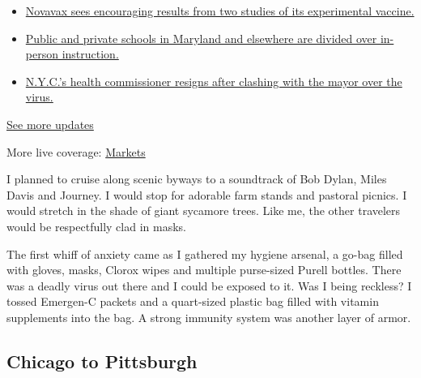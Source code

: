 \begin{itemize}
\tightlist
\item
  \href{https://www.nytimes.com/2020/08/04/world/coronavirus-cases.html?action=click\&pgtype=Article\&state=default\&region=MAIN_CONTENT_1\&context=storylines_live_updates\#link-1228a480}{Novavax
  sees encouraging results from two studies of its experimental
  vaccine.}
\item
  \href{https://www.nytimes.com/2020/08/04/world/coronavirus-cases.html?action=click\&pgtype=Article\&state=default\&region=MAIN_CONTENT_1\&context=storylines_live_updates\#link-4825b93}{Public
  and private schools in Maryland and elsewhere are divided over
  in-person instruction.}
\item
  \href{https://www.nytimes.com/2020/08/04/world/coronavirus-cases.html?action=click\&pgtype=Article\&state=default\&region=MAIN_CONTENT_1\&context=storylines_live_updates\#link-4d1eafa8}{N.Y.C.'s
  health commissioner resigns after clashing with the mayor over the
  virus.}
\end{itemize}

\href{https://www.nytimes.com/2020/08/04/world/coronavirus-cases.html?action=click\&pgtype=Article\&state=default\&region=MAIN_CONTENT_1\&context=storylines_live_updates}{See
more updates}

More live coverage:
\href{https://www.nytimes.com/live/2020/08/04/business/stock-market-today-coronavirus?action=click\&pgtype=Article\&state=default\&region=MAIN_CONTENT_1\&context=storylines_live_updates}{Markets}

I planned to cruise along scenic byways to a soundtrack of Bob Dylan,
Miles Davis and Journey. I would stop for adorable farm stands and
pastoral picnics. I would stretch in the shade of giant sycamore trees.
Like me, the other travelers would be respectfully clad in masks.

The first whiff of anxiety came as I gathered my hygiene arsenal, a
go-bag filled with gloves, masks, Clorox wipes and multiple purse-sized
Purell bottles. There was a deadly virus out there and I could be
exposed to it. Was I being reckless? I tossed Emergen-C packets and a
quart-sized plastic bag filled with vitamin supplements into the bag. A
strong immunity system was another layer of armor.

\hypertarget{chicago-to-pittsburgh}{%
\subsection{Chicago to Pittsburgh}\label{chicago-to-pittsburgh}}

